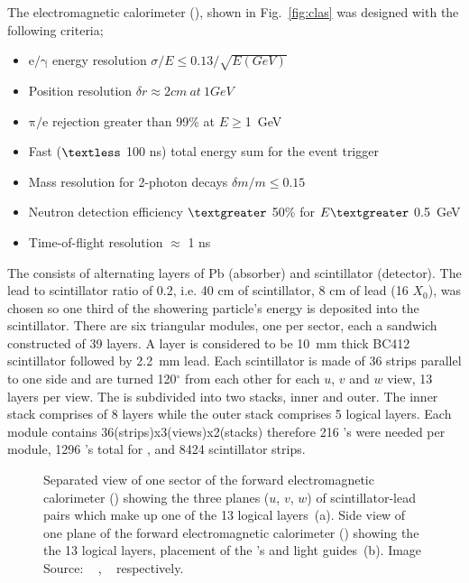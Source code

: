 The  electromagnetic calorimeter ()\cite{clas.ec}, shown in Fig.~\ref{fig:clas} was designed with the following criteria;
\begin{itemize}
\item $\mathrm{e/ \gamma}$ energy resolution $\sigma /E \leq 0.13/ \sqrt{E(GeV)}$
\item Position resolution $\delta r \approx 2cm \ at \ 1GeV$
\item $\mathrm{\pi / e}$ rejection greater than 99\% at $E \geq$1~GeV
\item Fast ($\textless$ 100 ns) total energy sum for the event trigger
\item Mass resolution for 2-photon decays $\delta m / m \leq 0.15$ 
\item Neutron detection efficiency $\textgreater$  50\% for  $E \textgreater$  0.5~GeV
\item Time-of-flight resolution $\approx$ 1 ns
\end{itemize}

The  consists of alternating layers of Pb (absorber) and scintillator (detector). The lead to scintillator ratio of 0.2, i.e. 40 cm of scintillator, 8 cm of lead (16 $X_{0}$), was chosen so one third of the showering particle's energy is deposited into the scintillator. There are six triangular  modules, one per sector, each a sandwich constructed of 39 layers. A layer is considered to be 10~mm thick BC412 scintillator followed by 2.2~mm lead. Each scintillator is made of 36 strips parallel to one side and are turned 120$^\circ$ from each other for each $u$, $v$ and $w$ view, 13 layers per view. The   is subdivided into two stacks, inner and outer. The inner stack comprises of 8 layers while the outer stack comprises 5 logical layers. Each module contains 36(strips)x3(views)x2(stacks) therefore 216 's were needed per module, 1296 's total for  , and 8424 scintillator strips. 

\begin{figure}[h!]\begin{center}

\caption[Separated view of one sector of the forward electromagnetic calorimeter () showing the three planes ($u$, $v$, $w$) of scintillator-lead pairs which make up one of the 13 logical layers]{Separated view of one sector of the forward electromagnetic calorimeter () showing the three planes ($u$, $v$, $w$) of scintillator-lead pairs which make up one of the 13 logical layers~(a). Side view of one plane of the forward electromagnetic calorimeter () showing the the 13 logical layers, placement of the 's and light guides~(b). Image Source: ~\cite{clas.ec} , ~\cite{clas.ec} respectively.} 

\end{center}\end{figure}

